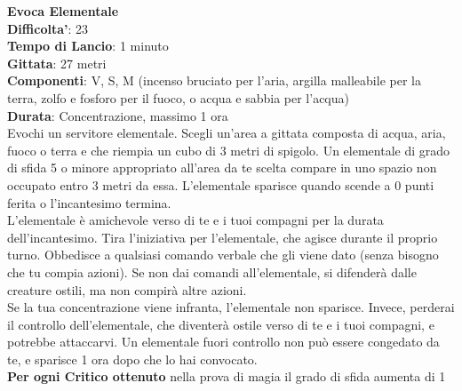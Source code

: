 \begin{multicols}{2}
\medskip\textbf{Evoca Elementale}\\
\textbf{Difficolta'}: 23\\
\textbf{Tempo di Lancio}: 1 minuto\\
\textbf{Gittata}: 27 metri\\
\textbf{Componenti}: V, S, M (incenso bruciato per l’aria, argilla malleabile per la terra, zolfo e fosforo per il fuoco, o acqua e sabbia per l’acqua) \\
\textbf{Durata}: Concentrazione, massimo 1 ora\\
Evochi un servitore elementale. Scegli un’area a gittata composta di acqua, aria, fuoco o terra e che riempia un cubo di 3 metri di spigolo. Un elementale di grado di sfida 5 o minore appropriato all’area da te scelta compare in uno spazio non occupato entro 3 metri da essa. L’elementale sparisce quando scende a 0 punti ferita o l’incantesimo termina.\\
L’elementale è amichevole verso di te e i tuoi compagni per la durata dell’incantesimo. Tira l’iniziativa per l’elementale, che agisce durante il proprio turno. Obbedisce a qualsiasi comando verbale che gli viene dato (senza bisogno che tu compia azioni). Se non dai comandi all’elementale, si difenderà dalle creature ostili, ma non compirà altre azioni.\\
Se la tua concentrazione viene infranta, l’elementale non sparisce. Invece, perderai il controllo dell’elementale, che diventerà ostile verso di te e i tuoi compagni, e potrebbe attaccarvi. Un elementale fuori controllo non può essere congedato da te, e sparisce 1 ora dopo che lo hai convocato.\\
\textbf{Per ogni Critico ottenuto} nella prova di magia il grado di sfida aumenta di 1


\end{multicols}
